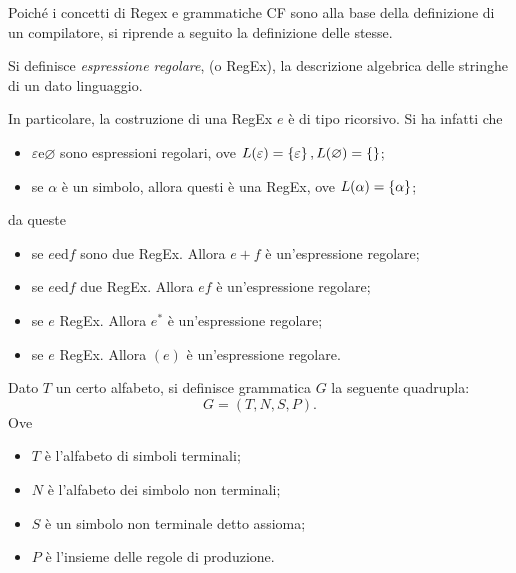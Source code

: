 \documentclass{subfiles}
\begin{document}
Poiché i concetti di Regex e grammatiche CF sono alla base della definizione di un compilatore,
si riprende a seguito la definizione delle stesse.
\begin{Definition*}
    Si definisce \emph{espressione regolare}, (o RegEx), la descrizione algebrica delle stringhe di un dato linguaggio.
\end{Definition*}
\noindent In particolare, la costruzione di una RegEx $e$ è di tipo ricorsivo. Si ha infatti che
\begin{itemize}
    \item $\varepsilon \text{e} \varnothing$ sono espressioni regolari, ove $L(\varepsilon) = \Set{\varepsilon}, L(\varnothing) = \Set{}$;
    \item se $\alpha$ è un simbolo, allora questi è una RegEx, ove $L(\alpha) = \Set{\alpha}$;
\end{itemize}
da queste
\begin{itemize}
    \item se $e \text{ed} f$ sono due RegEx. Allora $e + f$ è un'espressione regolare;
    \item se $e \text{ed} f$ due RegEx. Allora $ef$ è un'espressione regolare;
    \item se $e$ RegEx. Allora $e^{*}$ è un'espressione regolare;
    \item se $e$ RegEx. Allora $(e)$ è un'espressione regolare.
\end{itemize}

\begin{Definition*}
    Dato $T$ un certo alfabeto, si definisce grammatica $G$ la seguente quadrupla:
    $$
        G = (T, N, S, P).
    $$
    Ove
    \begin{itemize}
        \item $T$ è l'alfabeto di simboli terminali;
        \item $N$ è l'alfabeto dei simbolo non terminali;
        \item $S$ è un simbolo non terminale detto assioma;
        \item $P$ è l'insieme delle regole di produzione.
    \end{itemize}
\end{Definition*}
\end{document}
